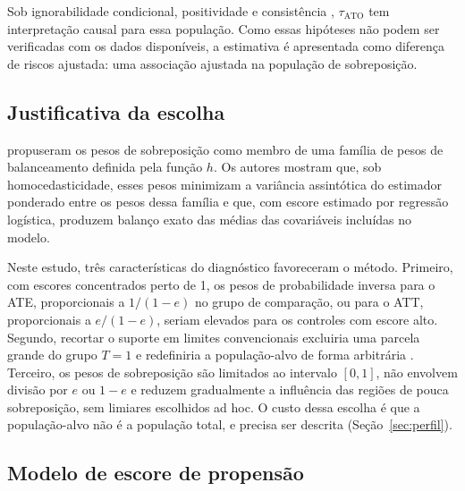\documentclass[11pt,a4paper]{article}
\newcommand{\ATO}{\mathrm{ATO}}
\begin{document}
Sob ignorabilidade condicional, positividade e consistência \cite{hernan2025},
$\tau_{\ATO}$ tem interpretação causal para essa população. Como essas hipóteses não
podem ser verificadas com os dados disponíveis, a estimativa é apresentada como diferença
de riscos ajustada: uma associação ajustada na população de sobreposição.

\subsection{Justificativa da escolha}

 propuseram os pesos de sobreposição como membro de uma família de
pesos de balanceamento definida pela função $h$. Os autores mostram que, sob
homocedasticidade, esses pesos minimizam a variância assintótica do estimador ponderado
entre os pesos dessa família e que, com escore estimado por regressão logística, produzem
balanço exato das médias das covariáveis incluídas no modelo.

Neste estudo, três características do diagnóstico favoreceram o método. Primeiro, com
escores concentrados perto de 1, os pesos de probabilidade inversa para o ATE, proporcionais
a $1/(1-e)$ no grupo de comparação, ou para o ATT, proporcionais a $e/(1-e)$, seriam
elevados para os controles com escore alto. Segundo, recortar o suporte em limites
convencionais excluiria uma parcela grande do grupo $T=1$ e redefiniria a população-alvo
de forma arbitrária \cite{crump2009}. Terceiro, os pesos de sobreposição são limitados ao
intervalo $[0,1]$, não envolvem divisão por $e$ ou $1-e$ e reduzem gradualmente a
influência das regiões de pouca sobreposição, sem limiares escolhidos ad hoc. O custo
dessa escolha é que a população-alvo não é a população total, e precisa ser descrita
(Seção~\ref{sec:perfil}).

\subsection{Modelo de escore de propensão}
\end{document}
